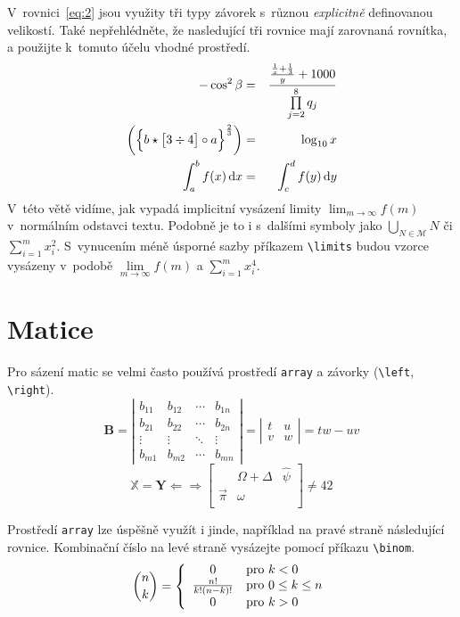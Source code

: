 \documentclass[a4paper, 11pt, twocolumn]{article}
\begin{document}
\noindent V~rovnici~\eqref{eq:2} jsou využity tři typy závorek s~různou \emph{explicitně} definovanou velikostí. Také nepřehlédněte, že nasledující tři rovnice mají zarovnaná rovnítka, a použijte k~tomuto účelu vhodné prostředí.
\begin{eqnarray} 
    -\cos^2 \beta & = & \frac{\frac{\frac{1}{x}+\frac{1}{3}}{y}+1000}{\prod\limits _{j=2}^8 q_j} \label{eq:1} \\
    \biggl(\Bigl\{b \star \bigl[3 \div 4\bigr]\circ a\Bigr\}^\frac{2}{3}\biggr) & = & \log_{10}x \label{eq:2} \\
    \int_a^b f(x)\,\mathrm{d}x & = & \int_c^d f(y)\,\mathrm{d}y \label{eq:3}
\end{eqnarray}
\noindent V~této větě vidíme, jak vypadá implicitní vysázení limity $\lim_{m\rightarrow\infty}f(m)$ v~normálním odstavci textu. Podobně je to i s~dalšími symboly jako $\bigcup_{N\in\mathcal{M}}N$ či $\sum^m_{i=1}x^2_i$. S~vynucením méně úsporné sazby příkazem \verb|\limits| budou vzorce vysázeny v~podobě $\lim\limits _{m\rightarrow\infty}f(m)$ a $\sum\limits _{i=1}^m x^4_i$.

\section{Matice}

Pro sázení matic se velmi často používá prostředí \verb|array| a závorky (\verb|\left|, \verb|\right|).
$$
    \mathbf{B} = \left| 
    \begin{array}{cccc}
         b_{11} & b_{12} & \cdots & b_{1n} \\
         b_{21} & b_{22} & \cdots & b_{2n} \\
         \vdots & \vdots & \ddots & \vdots \\
         b_{m1} & b_{m2} & \cdots & b_{mn}
    \end{array}
    \right| = \left|
    \begin{array}{cc}
         t&u\\
         v&w
    \end{array}
    \right| = tw-uv
$$$$
    \mathbb{X}=\mathbf{Y}\Leftarrow\!\Rightarrow\left[
    \begin{array}{ccc}
        & \Omega+\Delta & \hat{\psi} \\
        \vec{\pi} & \omega & \\
    \end{array}
    \right]\not=42 
$$

Prostředí \verb|array| lze úspěšně využít i jinde, například na pravé straně následující rovnice. Kombinační číslo na levé straně vysázejte pomocí příkazu \verb|\binom|.
$$
    \binom{n}{k}=\left\{
    \begin{array}{cc}
         0 & \text{pro } k < 0 \hfill \\
         \frac{n!}{k!(n-k)!} & \text{pro } 0 \leq k \leq n \hfill \\
         0 & \text{pro } k > 0 \hfill
    \end{array}
    \right.
$$
\end{document}
